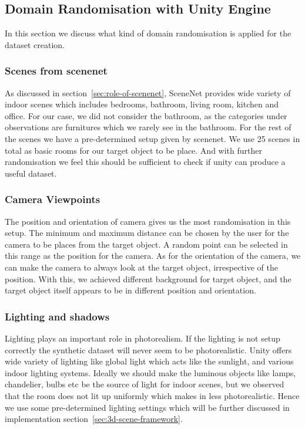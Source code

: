 \subsection{Domain Randomisation with Unity Engine}\label{subsec:domain-randomisation-with-unity-engine}
In this section we discuss what kind of domain randomisation is applied for the dataset creation.
\subsubsection{Scenes from scenenet}\label{subsubsec:scenes-from-scenenet}
As discussed in section~\ref{sec:role-of-scenenet}, SceneNet provides wide variety of indoor scenes which includes bedrooms, bathroom, living room, kitchen and office.
For our case, we did not consider the bathroom, as the categories under observations are furnitures which we rarely see in the bathroom.
For the rest of the scenes we have a pre-determined setup given by scenenet.
We use 25 scenes in total as basic rooms for our target object to be place.
And with further randomisation we feel this should be sufficient to check if unity can produce a useful dataset.

\subsubsection{Camera Viewpoints}
The position and orientation of camera gives us the most randomisation in this setup.
The minimum and maximum distance can be chosen by the user for the camera to be places from the target object.
A random point can be selected in this range as the position for the camera.
As for the orientation of the camera, we can make the camera to always look at the target object, irrespective of the position.
With this, we achieved different background for target object, and the target object itself appears to be in different position and orientation.

\subsubsection{Lighting and shadows}
Lighting plays an important role in photorealism.
If the lighting is not setup correctly the synthetic dataset will never seem to be photorealistic.
Unity offers wide variety of lighting like global light which acts like the sunlight, and various indoor lighting systems.
Ideally we should make the luminous objects like lamps, chandelier, bulbs etc be the source of light for indoor scenes, but we observed that the room does not lit up uniformly which makes in less photorealistic.
Hence we use some pre-determined lighting settings which will be further discussed in implementation section~\ref{sec:3d-scene-framework}.

